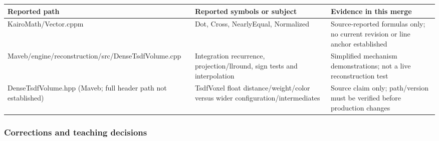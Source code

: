 {\def\LTcaptype{none} %
\begin{longtable}[]{@{}
  >{\raggedright\arraybackslash}p{}
  >{\raggedright\arraybackslash}p{}
  >{\raggedright\arraybackslash}p{}@{}}
\toprule\noalign{}
\begin{minipage}[b]{\linewidth}\raggedright
Reported path
\end{minipage} & \begin{minipage}[b]{\linewidth}\raggedright
Reported symbols or subject
\end{minipage} & \begin{minipage}[b]{\linewidth}\raggedright
Evidence in this merge
\end{minipage} \\
\midrule\noalign{}
\endhead
\bottomrule\noalign{}
\endlastfoot
KairoMath/Vector.cppm & Dot, Cross, NearlyEqual, Normalized & Source-reported formulas only; no current revision or line anchor established \\
Maveb/engine/reconstruction/src/DenseTsdfVolume.cpp & Integration recurrence, projection/llround, sign tests and interpolation & Simplified mechanism demonstrations; not a live reconstruction test \\
DenseTsdfVolume.hpp (Maveb; full header path not established) & TsdfVoxel float distance/weight/color versus wider configuration/intermediates & Source claim only; path/version must be verified before production changes \\
\end{longtable}
}

\subsubsection{Corrections and teaching decisions}\label{appendix-a103e7846d21-corrections-and-teaching-decisions}

